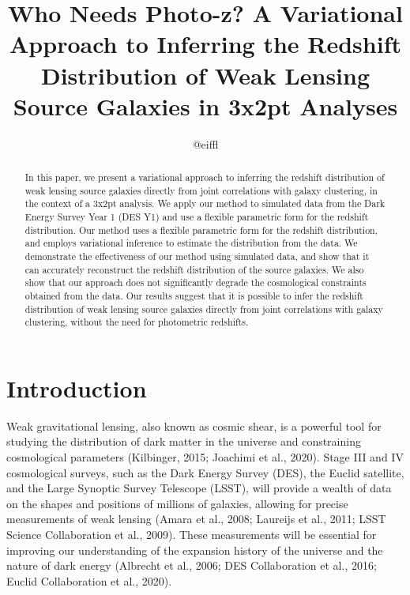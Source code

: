 \documentclass[twocolumn]{aastex631}
\begin{document}
\title{Who Needs Photo-z? A Variational Approach to Inferring the Redshift Distribution of Weak Lensing Source Galaxies in 3x2pt Analyses}

\author{@eiffl}

\begin{abstract}
In this paper, we present a variational approach to inferring the redshift distribution of weak lensing source galaxies directly from joint correlations with galaxy clustering, in the context of a 3x2pt analysis. We apply our method to simulated data from the Dark Energy Survey Year 1 (DES Y1) and use a flexible parametric form for the redshift distribution. Our method uses a flexible parametric form for the redshift distribution, and employs variational inference to estimate the distribution from the data. We demonstrate the effectiveness of our method using simulated data, and show that it can accurately reconstruct the redshift distribution of the source galaxies. We also show that our approach does not significantly degrade the cosmological constraints obtained from the data. Our results suggest that it is possible to infer the redshift distribution of weak lensing source galaxies directly from joint correlations with galaxy clustering, without the need for photometric redshifts.
\end{abstract}

\section{Introduction}
\label{sec:intro}

Weak gravitational lensing, also known as cosmic shear, is a powerful tool for studying the distribution of dark matter in the universe and constraining cosmological parameters (Kilbinger, 2015; Joachimi et al., 2020). Stage III and IV cosmological surveys, such as the Dark Energy Survey (DES), the Euclid satellite, and the Large Synoptic Survey Telescope (LSST), will provide a wealth of data on the shapes and positions of millions of galaxies, allowing for precise measurements of weak lensing (Amara et al., 2008; Laureijs et al., 2011; LSST Science Collaboration et al., 2009). These measurements will be essential for improving our understanding of the expansion history of the universe and the nature of dark energy (Albrecht et al., 2006; DES Collaboration et al., 2016; Euclid Collaboration et al., 2020).
\end{document}
